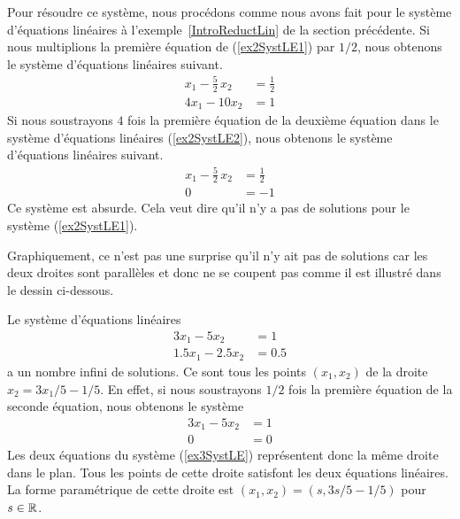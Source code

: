 {\begin{egg}
Pour résoudre ce système, nous procédons comme nous avons fait pour le
système d'équations linéaires à l'exemple~\ref{IntroReductLin} de la
section précédente.  Si nous multiplions la première équation de
(\ref{ex2SystLE1}) par $1/2$, nous obtenons le système d'équations
linéaires suivant.
\begin{equation} \label{ex2SystLE2}
\begin{split}
x_1 - \frac{5}{2}\,x_2 &= \frac{1}{2} \\
4x_1 - 10x_2 &= 1
\end{split}
\end{equation}
Si nous soustrayons $4$ fois la première équation de la deuxième équation
dans le système d'équations linéaires (\ref{ex2SystLE2}), nous
obtenons le système d'équations linéaires suivant.
\[
\begin{split}
x_1 - \frac{5}{2}\,x_2 &= \frac{1}{2} \\
0 &= -1
\end{split}
\]
Ce système est absurde.  Cela veut dire qu'il n'y a pas de solutions
pour le système (\ref{ex2SystLE1}).


Graphiquement, ce n'est pas une surprise qu'il n'y ait pas de
solutions car les deux droites sont parallèles et donc ne se coupent
pas comme il est illustré dans le dessin ci-dessous.
\end{egg}

\begin{egg}
Le système d'équations linéaires
\begin{equation}\label{ex3SystLE}
\begin{split}
3x_1- 5x_2 &= 1 \\
1.5x_1 - 2.5x_2 &= 0.5
\end{split}
\end{equation}
a un nombre infini de solutions.  Ce sont tous les points $(x_1,x_2)$ de
la droite $x_2 = 3x_1/5 - 1/5$.  En effet, si nous soustrayons $1/2$ fois la
première équation de la seconde équation, nous obtenons le système
\begin{align*}
3x_1- 5x_2 &= 1 \\
0 &= 0
\end{align*}
Les deux équations du système (\ref{ex3SystLE}) représentent donc la
même droite dans le plan.  Tous les points de cette droite satisfont
les deux équations linéaires.  La forme paramétrique de cette droite
est $(x_1,x_2) = (s, 3s/5 - 1/5)$ pour $s\in \mathbb{R}$.
\end{egg}

}

